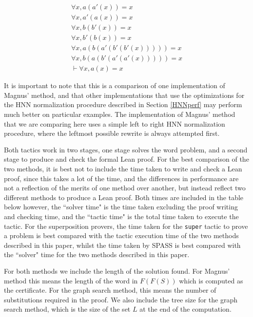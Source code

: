 \documentclass[12pt]{article} %
\theoremstyle{definition}
\theoremstyle{definition}
\theoremstyle{definition}
\theoremstyle{definition}
\begin{document}
\begin{equation}
  \begin{aligned}
  \forall x, a (a' (x)) = x \\
  \forall x, a' (a (x)) = x \\
  \forall x, b (b' (x)) = x \\
  \forall x, b' (b (x)) = x \\
  \forall x, a(b(a'(b'(b'(x))))) = x \\
  \forall x, b(a(b'(a'(a'(x))))) = x \\
  \vdash \forall x, a(x) = x
  \end{aligned}
\end{equation}

It is important to note that this is a comparison of one implementation
of Magnus' method, and that other implementations that use the optimizations for the HNN
normalization procedure described in Section \ref{HNNperf} may perform much better on
particular examples. The implementation of Magnus' method that
we are comparing here uses a simple left to right HNN normalization
procedure, where the leftmost possible rewrite is always attempted first.

Both tactics work in two stages, one stage solves the word problem, and a second stage
to produce and check the formal Lean proof. For the best comparison of the two
methods, it is best not to include the time taken to write and check a Lean proof,
since this takes a lot of the time, and the differences in performance are not a reflection
of the merits of one method over another, but instead reflect two different methods
to produce a Lean proof. Both times are included in the table below however, the ``solver
time" is the time taken excluding the proof writing and checking time, and
the ``tactic time" is the total time taken to execute the tactic. For the superposition
provers, the time taken for the \lstinline{super} tactic to prove a problem is best compared
with the tactic execution time of the two methods described in this paper, whilst
the time taken by SPASS is best compared with the ``solver" time for the two methods described in
this paper.

For both methods we include the length of the solution found. For Magnus'
method this means the length of the word in $F(F(S))$ which is computed as the certificate.
For the graph search method, this means the number of substitutions required
in the proof.
We also include the tree size for the graph search method, which is the
size of the set $L$ at the end of the computation.
\end{document}
